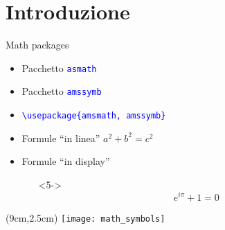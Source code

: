 \section{Introduzione}
  \begin{frame}{Math packages}

    \begin{itemize}
      \item<1-> Pacchetto \texttt{\textcolor{blue}{asmath}}
      \item<2-> Pacchetto \texttt{\textcolor{blue}{amssymb}}
	  \item<3-> \texttt{\textcolor{blue}{\textbackslash usepackage\{amsmath, amssymb\}}}
    \end{itemize}

    \begin{itemize}
      \item<4-> Formule ``in linea'' $a^2 + b^2 = c^2$
      \item<5-> Formule ``in display''
      \begin{itemize}
        \item[]<5-> \begin{equation} e^{i\pi}+1=0 \end{equation}
      \end{itemize}
    \end{itemize}
    
    \begin{textblock*}{5cm}(9cm,2.5cm)
      \texttt{[image: math\_symbols]}
    \end{textblock*}

\end{frame}
